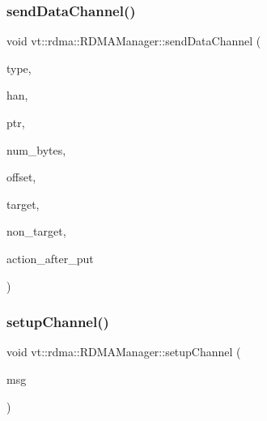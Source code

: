 \mbox{\label{structvt_1_1rdma_1_1_r_d_m_a_manager_acef2971a0d793bc8462beac8ef03ef51}} 
\subsubsection{\texorpdfstring{send\+Data\+Channel()}{sendDataChannel()}}
{\footnotesize\ttfamily void vt\+::rdma\+::\+R\+D\+M\+A\+Manager\+::send\+Data\+Channel (\begin{DoxyParamCaption}\item[{\hyperlink{namespacevt_1_1rdma_ac848e1d9da43db6294bd06f83e5d3946}{R\+D\+M\+A\+\_\+\+Type\+Type} const \&}]{type,  }\item[{\hyperlink{namespacevt_a10442579ec4e7ebef223818e64bcf908}{R\+D\+M\+A\+\_\+\+Handle\+Type} const \&}]{han,  }\item[{\hyperlink{namespacevt_a9e2c953286c7616f7c218e9951790776}{R\+D\+M\+A\+\_\+\+Ptr\+Type} const \&}]{ptr,  }\item[{\hyperlink{namespacevt_aab8d55968084610ce3b17057981e9300}{Byte\+Type} const \&}]{num\+\_\+bytes,  }\item[{\hyperlink{namespacevt_aab8d55968084610ce3b17057981e9300}{Byte\+Type} const \&}]{offset,  }\item[{\hyperlink{namespacevt_a866da9d0efc19c0a1ce79e9e492f47e2}{Node\+Type} const \&}]{target,  }\item[{\hyperlink{namespacevt_a866da9d0efc19c0a1ce79e9e492f47e2}{Node\+Type} const \&}]{non\+\_\+target,  }\item[{\hyperlink{namespacevt_ae0a5a7b18cc99d7b732cb4d44f46b0f3}{Action\+Type}}]{action\+\_\+after\+\_\+put }\end{DoxyParamCaption})\hspace{0.3cm}{\ttfamily [private]}}

\mbox{\label{structvt_1_1rdma_1_1_r_d_m_a_manager_a5189682bba9e4b73faa010bf78f96469}} 
\subsubsection{\texorpdfstring{setup\+Channel()}{setupChannel()}}
{\footnotesize\ttfamily void vt\+::rdma\+::\+R\+D\+M\+A\+Manager\+::setup\+Channel (\begin{DoxyParamCaption}\item[{\hyperlink{structvt_1_1rdma_1_1_create_channel}{Create\+Channel} $\ast$}]{msg }\end{DoxyParamCaption})\hspace{0.3cm}{\ttfamily [static]}}


